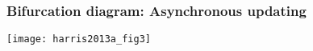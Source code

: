 \begin{frame}
  \frametitle{Bifurcation diagram: Asynchronous updating}

    \texttt{[image: harris2013a\_fig3]}  
  
\end{frame}



